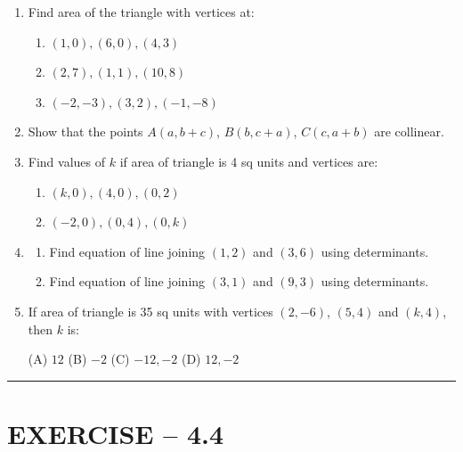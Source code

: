 \documentclass{article}
\begin{document}
\begin{enumerate}[label=\textbf{\arabic*.}, leftmargin=*, itemsep=0.8em]

\item Find area of the triangle with vertices at:
\begin{enumerate}
\item $(1,0), (6,0), (4,3)$
\item $(2,7), (1,1), (10,8)$
\item $(-2,-3), (3,2), (-1,-8)$
\end{enumerate}

\item Show that the points $A(a, b+c)$, $B(b, c+a)$, $C(c, a+b)$ are collinear.

\item Find values of $k$ if area of triangle is 4 sq units and vertices are:
\begin{enumerate}
\item $(k,0), (4,0), (0,2)$
\item $(-2,0), (0,4), (0,k)$
\end{enumerate}

\item
\begin{enumerate}
\item Find equation of line joining $(1,2)$ and $(3,6)$ using determinants.
\item Find equation of line joining $(3,1)$ and $(9,3)$ using determinants.
\end{enumerate}

\item If area of triangle is 35 sq units with vertices $(2,-6)$, $(5,4)$ and $(k,4)$, then $k$ is:

(A) $12$ \quad
(B) $-2$ \quad
(C) $-12,-2$ \quad
(D) $12,-2$

\end{enumerate}

\vspace{1cm}
\hrule
\vspace{0.5cm}


\section*{EXERCISE -- 4.4}
\end{document}

